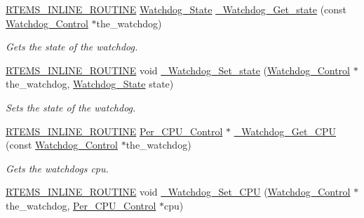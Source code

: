 \begin{DoxyCompactItemize}
\mbox{\hyperlink{group__RTEMSScoreBaseDefs_gac216239df231d5dbd15e3520b0b9313f}{R\+T\+E\+M\+S\+\_\+\+I\+N\+L\+I\+N\+E\+\_\+\+R\+O\+U\+T\+I\+NE}} \mbox{\hyperlink{group__RTEMSScoreWatchdog_ga05e885fccc21abb152cc73f29640c679}{Watchdog\+\_\+\+State}} \mbox{\hyperlink{group__RTEMSScoreWatchdog_gace59e3b987e52e536a15534fa1f91ec5}{\+\_\+\+Watchdog\+\_\+\+Get\+\_\+state}} (const \mbox{\hyperlink{structWatchdog__Control}{Watchdog\+\_\+\+Control}} $\ast$the\+\_\+watchdog)
\begin{DoxyCompactList}\small\item\em Gets the state of the watchdog. \end{DoxyCompactList}\item 
\mbox{\hyperlink{group__RTEMSScoreBaseDefs_gac216239df231d5dbd15e3520b0b9313f}{R\+T\+E\+M\+S\+\_\+\+I\+N\+L\+I\+N\+E\+\_\+\+R\+O\+U\+T\+I\+NE}} void \mbox{\hyperlink{group__RTEMSScoreWatchdog_ga08d63637741832757cddfc443e9cf473}{\+\_\+\+Watchdog\+\_\+\+Set\+\_\+state}} (\mbox{\hyperlink{structWatchdog__Control}{Watchdog\+\_\+\+Control}} $\ast$the\+\_\+watchdog, \mbox{\hyperlink{group__RTEMSScoreWatchdog_ga05e885fccc21abb152cc73f29640c679}{Watchdog\+\_\+\+State}} state)
\begin{DoxyCompactList}\small\item\em Sets the state of the watchdog. \end{DoxyCompactList}\item 
\mbox{\hyperlink{group__RTEMSScoreBaseDefs_gac216239df231d5dbd15e3520b0b9313f}{R\+T\+E\+M\+S\+\_\+\+I\+N\+L\+I\+N\+E\+\_\+\+R\+O\+U\+T\+I\+NE}} \mbox{\hyperlink{structPer__CPU__Control}{Per\+\_\+\+C\+P\+U\+\_\+\+Control}} $\ast$ \mbox{\hyperlink{group__RTEMSScoreWatchdog_gaf1cb44dc5d0789c722e5272370fc20b4}{\+\_\+\+Watchdog\+\_\+\+Get\+\_\+\+C\+PU}} (const \mbox{\hyperlink{structWatchdog__Control}{Watchdog\+\_\+\+Control}} $\ast$the\+\_\+watchdog)
\begin{DoxyCompactList}\small\item\em Gets the watchdog\textquotesingle{}s cpu. \end{DoxyCompactList}\item 
\mbox{\hyperlink{group__RTEMSScoreBaseDefs_gac216239df231d5dbd15e3520b0b9313f}{R\+T\+E\+M\+S\+\_\+\+I\+N\+L\+I\+N\+E\+\_\+\+R\+O\+U\+T\+I\+NE}} void \mbox{\hyperlink{group__RTEMSScoreWatchdog_ga3de62172597bf475ce849c935c51ed05}{\+\_\+\+Watchdog\+\_\+\+Set\+\_\+\+C\+PU}} (\mbox{\hyperlink{structWatchdog__Control}{Watchdog\+\_\+\+Control}} $\ast$the\+\_\+watchdog, \mbox{\hyperlink{structPer__CPU__Control}{Per\+\_\+\+C\+P\+U\+\_\+\+Control}} $\ast$cpu)

\end{DoxyCompactItemize}
